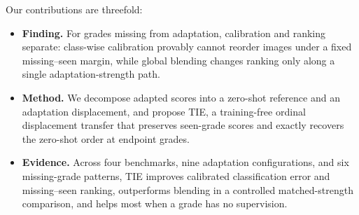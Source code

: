 Our contributions are threefold:
\begin{itemize}
  \item \textbf{Finding.}
For grades missing from adaptation, calibration and ranking separate: class-wise calibration provably cannot reorder images under a fixed missing--seen margin, while global blending changes ranking only along a single adaptation-strength path.
  \item \textbf{Method.} We decompose adapted scores into a zero-shot reference and an adaptation displacement, and propose TIE, a training-free ordinal displacement transfer that preserves seen-grade scores and exactly recovers the zero-shot order at endpoint grades.
  \item \textbf{Evidence.} Across four benchmarks, nine adaptation configurations, and six missing-grade patterns, TIE improves calibrated classification error and missing--seen ranking, outperforms blending in a controlled matched-strength comparison, and helps most when a grade has no supervision.
\end{itemize}


